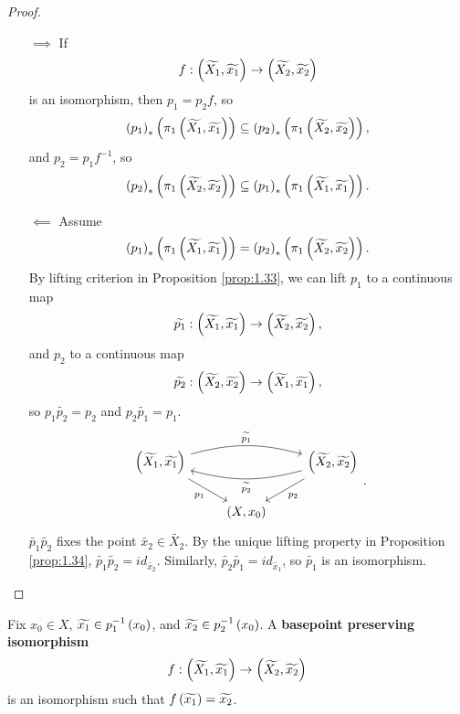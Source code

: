 \begin{proof}
\hfill
\begin{itemize}
\item[$ \implies $] If
$$ f : \left( \widetilde{X_1}, \widetilde{x_1} \right) \to \left( \widetilde{X_2}, \widetilde{x_2} \right) $$
is an isomorphism, then $ p_1 = p_2f $, so
$$ \left( p_1 \right)_*\left( \pi_1\left( \widetilde{X_1}, \widetilde{x_1} \right) \right) \subseteq \left( p_2 \right)_*\left( \pi_1\left( \widetilde{X_2}, \widetilde{x_2} \right) \right), $$
and $ p_2 = p_1f^{-1} $, so
$$ \left( p_2 \right)_*\left( \pi_1\left( \widetilde{X_2}, \widetilde{x_2} \right) \right) \subseteq \left( p_1 \right)_*\left( \pi_1\left( \widetilde{X_1}, \widetilde{x_1} \right) \right). $$
\item[$ \impliedby $] Assume
$$ \left( p_1 \right)_*\left( \pi_1\left( \widetilde{X_1}, \widetilde{x_1} \right) \right) = \left( p_2 \right)_*\left( \pi_1\left( \widetilde{X_2}, \widetilde{x_2} \right) \right). $$
By lifting criterion in Proposition \ref{prop:1.33}, we can lift $ p_1 $ to a continuous map
$$ \widetilde{p_1} : \left( \widetilde{X_1}, \widetilde{x_1} \right) \to \left( \widetilde{X_2}, \widetilde{x_2} \right), $$
and $ p_2 $ to a continuous map
$$ \widetilde{p_2} : \left( \widetilde{X_2}, \widetilde{x_2} \right) \to \left( \widetilde{X_1}, \widetilde{x_1} \right), $$
so $ p_1\widetilde{p_2} = p_2 $ and $ p_2\widetilde{p_1} = p_1 $.
$$
\begin{tikzcd}
\rb{\widetilde{X_1}, \widetilde{x_1}} \arrow[bend left=15]{rr}{\widetilde{p_1}} \arrow[swap]{dr}{p_1} & & \rb{\widetilde{X_2}, \widetilde{x_2}} \arrow{dl}{p_2} \arrow[bend left=15]{ll}{\widetilde{p_2}} \\
& \rb{X, x_0} &
\end{tikzcd}.
$$
$ \widetilde{p_1}\widetilde{p_2} $ fixes the point $ \widetilde{x_2} \in \widetilde{X_2} $. By the unique lifting property in Proposition \ref{prop:1.34}, $ \widetilde{p_1}\widetilde{p_2} = id_{\widetilde{x_2}} $. Similarly, $ \widetilde{p_2}\widetilde{p_1} = id_{\widetilde{x_1}} $, so $ \widetilde{p_1} $ is an isomorphism.
\end{itemize}
\end{proof}


Fix $ x_0 \in X $, $ \widetilde{x_1} \in p_1^{-1}\left( x_0 \right) $, and $ \widetilde{x_2} \in p_2^{-1}\left( x_0 \right) $. A \textbf{basepoint preserving isomorphism}
$$ f : \left( \widetilde{X_1}, \widetilde{x_1} \right) \to \left( \widetilde{X_2}, \widetilde{x_2} \right) $$
is an isomorphism such that $ f\left( \widetilde{x_1} \right) = \widetilde{x_2} $.


